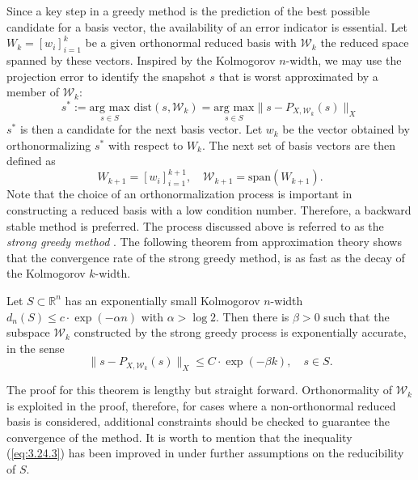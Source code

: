 Since a key step in a greedy method is the prediction of the best possible candidate for a basis vector, the availability of an error indicator is essential. Let $W_k = [ w_i ]_{i=1}^k$ be a given orthonormal reduced basis with $\mathcal W_k$ the reduced space spanned by these vectors. Inspired by the Kolmogorov $n$-width, we may use the projection error to identify the snapshot $s$ that is worst approximated by a member of $\mathcal W_k$:
\begin{equation} \label{eq:3.24.1}
	s^* := \underset{s\in S}{\text{arg\ max} } \text{\ dist}(s,\mathcal W_k)
= \underset{s\in S}{\text{arg\ max} } \| s - P_{X,\mathcal W_k}(s) \|_X \end{equation}
$s^*$ is then a candidate for the next basis vector. Let $w_k$ be the vector obtained by orthonormalizing $s^*$ with respect to $W_k$. The next set of basis vectors are then defined as
\begin{equation} \label{eq:3.24.2}
	W_{k+1} = [w_i]_{i=1}^{k+1}, \quad \mathcal W_{k+1} = \text{span}(W_{k+1}). 
\end{equation}
Note that the choice of an orthonormalization process is important in constructing a reduced basis with a low condition number. Therefore, a backward stable method is preferred. The process discussed above is referred to as the \emph{strong greedy method} \cite{quarteroni2015reduced}. The following theorem from approximation theory shows that the convergence rate of the strong greedy method, is as fast as the decay of the Kolmogorov $k$-width. 
\begin{theorem}
	\cite{doi:10.1137/100795772} Let $S\subset \mathbb R^{n}$ has an exponentially small Kolmogorov $n$-width $d_n(S) \leq c\cdot \exp(-\alpha n)$ with $\alpha > \log 2$. Then there is $\beta > 0$ such that the subspace $\mathcal W_k$ constructed by the strong greedy process is exponentially accurate, in the sense
\begin{equation} \label{eq:3.24.3}
	\| s - P_{X,\mathcal W_k}(s) \|_X \leq C\cdot \exp(-\beta k), \quad s \in S.
\end{equation}
\end{theorem}
The proof for this theorem is lengthy but straight forward. Orthonormality of $\mathcal W_k$ is exploited in the proof, therefore, for cases where a non-orthonormal reduced basis is considered, additional constraints should be checked to guarantee the convergence of the method. It is worth to mention that the inequality (\ref{eq:3.24.3}) has been improved in \cite{buffa2012priori} under further assumptions on the reducibility of $S$. 


